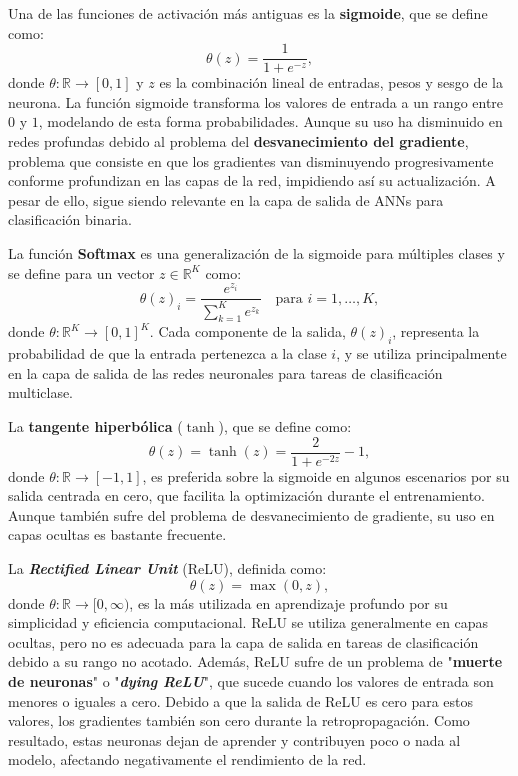 Una de las funciones de activación más antiguas es la \textbf{sigmoide}, que se define como:
\begin{equation}
	\theta(z) = \frac{1}{1 + e^{-z}},
\end{equation}
donde \( \theta : \mathbb{R} \to [0,1] \) y \( z \) es la combinación lineal de entradas, pesos y sesgo de la neurona. La función sigmoide transforma los valores de entrada a un rango entre \(0\) y \(1\), modelando de esta forma probabilidades. Aunque su uso ha disminuido en redes profundas debido al problema del \textbf{desvanecimiento del gradiente}, problema que consiste en que los gradientes van disminuyendo progresivamente conforme profundizan en las capas de la red, impidiendo así su actualización. A pesar de ello, sigue siendo relevante en la capa de salida de ANNs para clasificación binaria.

La función \textbf{Softmax} es una generalización de la sigmoide para múltiples clases y se define para un vector \( z \in \mathbb{R}^K \) como:
\begin{equation}
	\theta(z)_i = \frac{e^{z_i}}{\sum_{k=1}^K e^{z_k}} \quad \text{para } i = 1, \ldots, K,
\end{equation}
donde \( \theta : \mathbb{R}^K \to [0,1]^K \). Cada componente de la salida, \(\theta(z)_i\), representa la probabilidad de que la entrada pertenezca a la clase \(i\), y se utiliza principalmente en la capa de salida de las redes neuronales para tareas de clasificación multiclase.

La \textbf{tangente hiperbólica} (\(\tanh\)), que se define como:
\begin{equation}
	\theta(z) = \tanh(z) = \frac{2}{1 + e^{-2z}} - 1,
\end{equation}
donde \( \theta : \mathbb{R} \to [-1,1] \), es preferida sobre la sigmoide en algunos escenarios por su salida centrada en cero, que facilita la optimización durante el entrenamiento. Aunque también sufre del problema de desvanecimiento de gradiente, su uso en capas ocultas es bastante frecuente.

La \textbf{\textit{Rectified Linear Unit}} (ReLU), definida como:
\begin{equation}
	\theta(z) = \max(0, z),
\end{equation}
donde \( \theta : \mathbb{R} \to [0, \infty) \), es la más utilizada en aprendizaje profundo por su simplicidad y eficiencia computacional. ReLU se utiliza generalmente en capas ocultas, pero no es adecuada para la capa de salida en tareas de clasificación debido a su rango no acotado. Además, ReLU sufre de un problema de "\textbf{muerte de neuronas}" o "\textbf{\textit{dying ReLU}}", que sucede cuando los valores de entrada son menores o iguales a cero. Debido a que la salida de ReLU es cero para estos valores, los gradientes también son cero durante la retropropagación. Como resultado, estas neuronas dejan de aprender y contribuyen poco o nada al modelo, afectando negativamente el rendimiento de la red.

